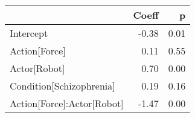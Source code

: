 \begin{tabular}{lrr}
\toprule
{} &  Coeff &    p \\
\midrule
Intercept                      &  -0.38 & 0.01 \\
Action[Force]                &   0.11 & 0.55 \\
Actor[Robot]                 &   0.70 & 0.00 \\
Condition[Schizophrenia]     &   0.19 & 0.16 \\
Action[Force]:Actor[Robot] &  -1.47 & 0.00 \\
\bottomrule
\end{tabular}
